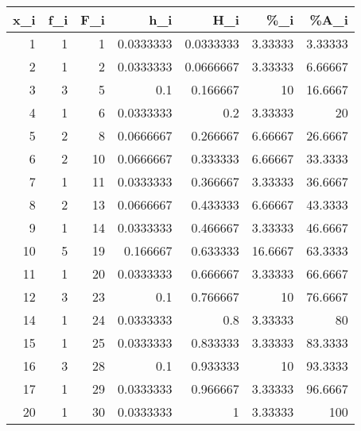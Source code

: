 \documentclass[spanish, 11pt]{exam}
\begin{document}
\begin{questions}
\begin{multicols}{1}
\begin{parts}
\begin{solution}
\begin{tabular}{rrrrrrr}
\hline
   x\_i &   f\_i &   F\_i &       h\_i &       H\_i &      \%\_i &      \%A\_i \\
\hline
     1 &     1 &     1 & 0.0333333 & 0.0333333 &  3.33333 &   3.33333 \\
     2 &     1 &     2 & 0.0333333 & 0.0666667 &  3.33333 &   6.66667 \\
     3 &     3 &     5 & 0.1       & 0.166667  & 10       &  16.6667  \\
     4 &     1 &     6 & 0.0333333 & 0.2       &  3.33333 &  20       \\
     5 &     2 &     8 & 0.0666667 & 0.266667  &  6.66667 &  26.6667  \\
     6 &     2 &    10 & 0.0666667 & 0.333333  &  6.66667 &  33.3333  \\
     7 &     1 &    11 & 0.0333333 & 0.366667  &  3.33333 &  36.6667  \\
     8 &     2 &    13 & 0.0666667 & 0.433333  &  6.66667 &  43.3333  \\
     9 &     1 &    14 & 0.0333333 & 0.466667  &  3.33333 &  46.6667  \\
    10 &     5 &    19 & 0.166667  & 0.633333  & 16.6667  &  63.3333  \\
    11 &     1 &    20 & 0.0333333 & 0.666667  &  3.33333 &  66.6667  \\
    12 &     3 &    23 & 0.1       & 0.766667  & 10       &  76.6667  \\
    14 &     1 &    24 & 0.0333333 & 0.8       &  3.33333 &  80       \\
    15 &     1 &    25 & 0.0333333 & 0.833333  &  3.33333 &  83.3333  \\
    16 &     3 &    28 & 0.1       & 0.933333  & 10       &  93.3333  \\
    17 &     1 &    29 & 0.0333333 & 0.966667  &  3.33333 &  96.6667  \\
    20 &     1 &    30 & 0.0333333 & 1         &  3.33333 & 100       \\
\hline

\end{tabular}
\end{solution}
\end{parts}
\end{multicols}
\end{questions}
\end{document}
